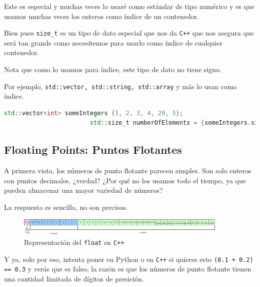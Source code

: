 \documentclass[12pt, fleqn]{report}                             %
\theoremstyle{break}                                            %
\newcommand \Cpp  {\texttt{C++} }                               %
\begin{document}
                    Este es especial y muchas veces lo usaré como estándar de tipo numérico
                    y es que usamos muchas veces los enteros como índice de un contenedor.

                    Bien pues \texttt{size\_t} es un tipo de dato especial que nos da \Cpp
                    que nos asegura que será tan grande como necesitemos para usarlo como índice
                    de cualquier contenedor.

                    Nota que como lo usamos para índice, este tipo de dato no tiene signo.

                    Por ejemplo, \texttt{std::vector, std::string, std::array} y más lo usan
                    como índice.

                    \begin{lstlisting}[language=C++, gobble=20]
                        std::vector<int> someIntegers {1, 2, 3, 4, 20, 5};
                        std::size_t numberOfElements = {someIntegers.size()}; 
                    \end{lstlisting}
                    

            \clearpage
            \subsection{Floating Points: Puntos Flotantes}

                A primera vista, los números de punto flotante parecen simples.
                Son solo enteros con puntos decimales, ¿verdad? 
                ¿Por qué no los usamos todo el tiempo, ya que pueden almacenar una mayor variedad de números?

                La respuesta es sencilla, no son precisos.

                \begin{figure}[h]
                    \centering
                    \includegraphics[width=0.9\textwidth]{IEEEFP}
                    \caption{\footnotesize{Representación del \texttt{float} en \Cpp}}
                \end{figure}

                Y ya, solo por eso, intenta poner en Python o en \Cpp si quieres esto 
                \texttt{(0.1 + 0.2) == 0.3} y verás que es falso, la razón es que los números de punto
                flotante tienen una cantidad límitada de dígitos de presición.
\end{document}
